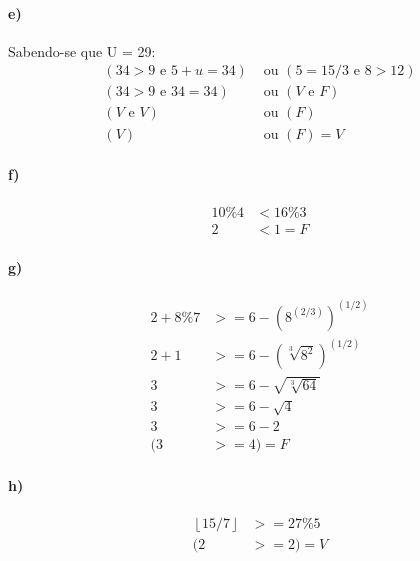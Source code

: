 \documentclass[pdftex,a4paper,12pt,brazil]{article} %
\begin{document}
\paragraph{e)} Sabendo-se que U = 29:
\begin{equation*}
  \begin{split}
    (34 > 9 \text{ e } 5 + u = 34) & \text{ ou } (5 = 15/3 \text{ e } 8 > 12)\\
    (34 > 9 \text{ e } 34 = 34)    & \text{ ou } (V \text{ e } F)\\
    (V \text{ e } V)               & \text{ ou } (F)\\
    (V)                          & \text{ ou } (F) = V
  \end{split}
\end{equation*}

\paragraph{f)}
\begin{equation*}
  \begin{split}
    10\%4 & < 16\%3\\
    2 & < 1 = F
  \end{split}
\end{equation*}

\paragraph{g)}
\begin{equation*}
  \begin{split}
    2 + 8 \% 7 & >= 6 - \left (8^{(2/3)}\right)^{(1/2)}\\
    2 + 1      & >= 6 - \left (\sqrt[3]{8^2}\right)^{(1/2)}\\
    3          & >= 6 - \sqrt{\sqrt[3]{64}}\\
    3          & >= 6 - \sqrt{4}\\
    3          & >= 6 - 2\\
    (3          & >= 4) = F
  \end{split}
\end{equation*}

\paragraph{h)}
\begin{equation*}
  \begin{split}
    \left \lfloor{15/7}\right \rfloor & >= 27 \% 5\\
    (2 & >= 2 )= V
  \end{split}
\end{equation*}
\end{document}
